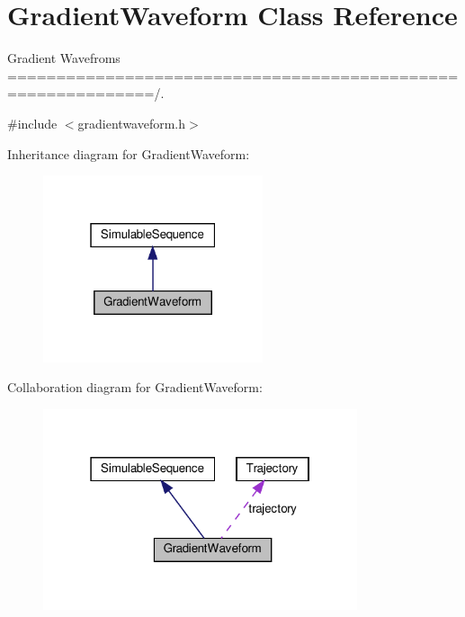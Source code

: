 \hypertarget{class_gradient_waveform}{}\section{Gradient\+Waveform Class Reference}
\label{class_gradient_waveform}


Gradient Wavefroms =============================================================/.  




{\ttfamily \#include $<$gradientwaveform.\+h$>$}



Inheritance diagram for Gradient\+Waveform\+:
\nopagebreak
\begin{figure}[H]
\begin{center}
\leavevmode
\includegraphics[width=183pt]{class_gradient_waveform__inherit__graph}
\end{center}
\end{figure}


Collaboration diagram for Gradient\+Waveform\+:
\nopagebreak
\begin{figure}[H]
\begin{center}
\leavevmode
\includegraphics[width=262pt]{class_gradient_waveform__coll__graph}
\end{center}
\end{figure}
